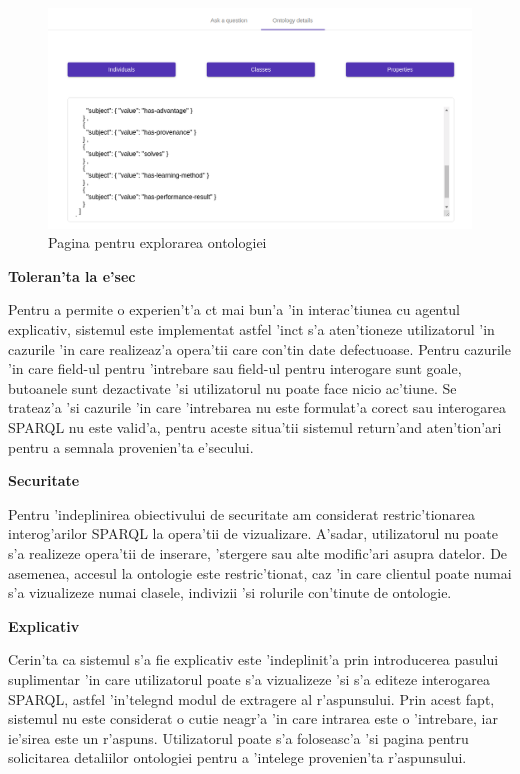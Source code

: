 \documentclass[12pt,a4paper,twoside]{report}
\begin{document}
\begin{figure}
    \centering
    \includegraphics[width = 0.65 \linewidth]{img/ui2.png}
        \caption{Pagina pentru explorarea ontologiei}
    \label{fig:ui2}
\end{figure}


{\bf Toleran'ta la e'sec}

Pentru a permite o experien't'a c\ia t mai bun'a 'in interac'tiunea cu agentul explicativ, sistemul este implementat astfel 'inc\ia t s'a aten'tioneze utilizatorul 'in cazurile 'in care realizeaz'a opera'tii care con'tin date defectuoase. Pentru cazurile 'in care field-ul pentru 'intrebare sau field-ul pentru interogare sunt goale, butoanele sunt dezactivate 'si utilizatorul nu poate face nicio ac'tiune. Se trateaz'a 'si cazurile 'in care 'intrebarea nu este formulat'a corect sau interogarea SPARQL nu este valid'a, pentru aceste situa'tii sistemul return'and aten'tion'ari pentru a semnala provenien'ta e'secului.

{\bf Securitate}

Pentru 'indeplinirea obiectivului de securitate am considerat restric'tionarea interog'arilor SPARQL la opera'tii de vizualizare. A'sadar, utilizatorul nu poate s'a realizeze opera'tii de inserare, 'stergere sau alte modific'ari asupra datelor. De asemenea, accesul la ontologie este restric'tionat, caz 'in care clientul poate numai s'a vizualizeze numai clasele, indivizii 'si rolurile con'tinute de ontologie.  

{\bf Explicativ}

Cerin'ta ca sistemul s'a fie explicativ este 'indeplinit'a prin introducerea pasului suplimentar 'in care utilizatorul poate s'a vizualizeze 'si s'a editeze interogarea SPARQL, astfel 'in'teleg\ia nd modul de extragere al r'aspunsului. Prin acest fapt, sistemul nu este considerat o cutie neagr'a 'in care intrarea este o 'intrebare, iar ie'sirea este un r'aspuns. Utilizatorul poate s'a foloseasc'a 'si pagina pentru solicitarea detaliilor ontologiei pentru a 'intelege provenien'ta r'aspunsului.
\end{document}

